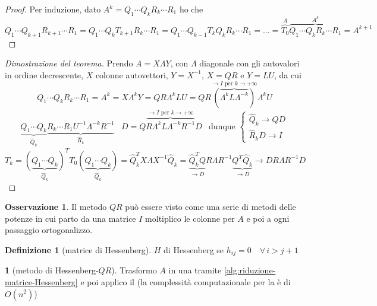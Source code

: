 \documentclass[a4paper,10pt]{article}
\theoremstyle{definition}
\theoremstyle{indentdefinition}
\newtheorem{defn}{Definizione}[section]
\theoremstyle{indenttheorem}
\theoremstyle{myremark}
\newtheorem*{rem*}{Osservazione}
\theoremstyle{indentgeneral}
\newtheorem{lyxalgorithm}[thm]{\protect\algorithmname}
\theoremstyle{plain}
\theoremstyle{plain}
\begin{document}
\begin{proof}
Per induzione, dato $A^{k}=Q_{1}{\scriptstyle \cdots}Q_{k}R_{k}{\scriptstyle \cdots}R_{1}$
ho che 
\[
Q_{1}{\scriptstyle \cdots}Q_{k+1}R_{k+1}{\scriptstyle \cdots}R_{1}=Q_{1}{\scriptstyle \cdots}Q_{k}T_{k+1}R_{k}{\scriptstyle \cdots}R_{1}=Q_{1}{\scriptstyle \cdots}Q_{k-1}T_{k}Q_{k}R_{k}{\scriptstyle \cdots}R_{1}=\ldots=\overset{A}{\overbrace{T_{0}}}\overset{A^{k}}{\overbrace{Q_{1}{\scriptstyle \cdots}Q_{k}R_{k}{\scriptstyle \cdots}R_{1}}}=A^{k+1}
\]
\end{proof}
%
\begin{proof}[Dimostrazione del teorema]
Prendo $A=X\Lambda Y$, con $\Lambda$ diagonale con gli autovalori
in ordine decrescente, $X$ colonne autovettori, $Y=X^{-1}$, $X=QR$
e $Y=LU$, da cui
\[
Q_{1}{\scriptstyle \cdots}Q_{k}R_{k}{\scriptstyle \cdots}R_{1}=A^{k}=X\Lambda^{k}Y=QR\Lambda^{k}LU=QR\overset{\longrightarrow I\text{ per }k\rightarrow+\infty}{\left(\overbrace{\Lambda^{k}L\Lambda^{-k}}\right)}\Lambda^{k}U
\]
\begin{align*}
\underset{\hat{Q}_{k}}{\underbrace{Q_{1}{\scriptstyle \cdots}Q_{k}}}\underset{\hat{R}_{k}}{\underbrace{R_{k}{\scriptstyle \cdots}R_{1}U^{-1}\Lambda^{-k}R^{-1}}} & D=Q\overset{\longrightarrow I\text{ per }k\rightarrow+\infty}{\overbrace{R\Lambda^{k}L\Lambda^{-k}R^{-1}}}D & \text{dunque }\begin{cases}
\hat{Q}_{k}\longrightarrow QD\\
\hat{R}_{k}D\longrightarrow I
\end{cases}
\end{align*}
\[
T_{k}=\underset{\hat{Q}_{k}}{\left(\underbrace{Q_{1}{\scriptstyle \cdots}Q_{k}}\right)}^{T}T_{0}\underset{\hat{Q}_{k}}{\left(\underbrace{Q_{1}{\scriptstyle \cdots}Q_{k}}\right)}=\hat{Q}_{k}^{T}X\Lambda X^{-1}\hat{Q}_{k}=\underset{\longrightarrow D}{\underbrace{\hat{Q}_{k}^{T}Q}}R\Lambda R^{-1}\underset{\longrightarrow D}{\underbrace{Q^{T}\hat{Q}_{k}}}\longrightarrow DR\Lambda R^{-1}D
\]
\end{proof}
\begin{rem*}
Il metodo $QR$ può essere visto come una serie di metodi delle potenze
in cui parto da una matrice $I$ moltiplico le colonne per $A$ e
poi a ogni passaggio ortogonalizzo.
\end{rem*}
\begin{defn}[matrice di Hessenberg]
\label{def:matrice-di-Hessenberg}$H$ di Hessenberg se $h_{ij}=0\quad\forall\,i>j+1$ 
\end{defn}

\begin{lyxalgorithm}[metodo di Hessenberg-$QR$]
Trasformo $A$ in una  tramite
\ref{alg:riduzione-matrice-Hessenberg} e poi applico il 
(la complessità computazionale per la 
è di $O\left(n^{2}\right)$)
\end{lyxalgorithm}
\end{document}
